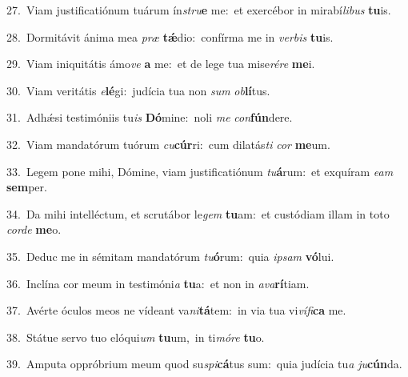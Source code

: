 {\numbfont\textcolor{\numbcolor}{27.}}~Viam justificatiónum tuárum ín\-\textit{stru}\-\textbf{e} me:~\star et exercébor in mirabí\-\textit{li}\-\textit{bus} \textbf{tu}\-is.\par
{\numbfont\textcolor{\numbcolor}{28.}}~Dormitávit ánima mea \textit{præ} \textbf{tǽ}\-dio:~\star confírma me in \textit{ver}\-\textit{bis} \textbf{tu}\-is.\par
{\numbfont\textcolor{\numbcolor}{29.}}~Viam iniquitátis ámo\textit{ve} \textbf{a} me:~\star et de lege tua mise\-\textit{ré}\-\textit{re} \textbf{me}\-i.\par
{\numbfont\textcolor{\numbcolor}{30.}}~Viam veritátis \textit{e}\-\textbf{lé}gi:~\star judícia tua non \textit{sum} \textit{ob}\-\textbf{lí}tus.\par
{\numbfont\textcolor{\numbcolor}{31.}}~Adhǽsi testimóniis tu\textit{is} \textbf{Dó}\-mine:~\star noli \textit{me} \textit{con}\-\textbf{fún}dere.\par
{\numbfont\textcolor{\numbcolor}{32.}}~Viam mandatórum tuórum \textit{cu}\-\textbf{cúr}ri:~\star cum dilatás\textit{ti} \textit{cor} \textbf{me}\-um.\par
{\numbfont\textcolor{\numbcolor}{33.}}~Legem pone mihi, Dómine, viam justificatiónum \textit{tu}\-\textbf{á}rum:~\star et exquíram \textit{e}\-\textit{am} \textbf{sem}\-per.\par
{\numbfont\textcolor{\numbcolor}{34.}}~Da mihi intelléctum, et scrutábor le\textit{gem} \textbf{tu}\-am:~\star et custódiam illam in toto \textit{cor}\-\textit{de} \textbf{me}\-o.\par
{\numbfont\textcolor{\numbcolor}{35.}}~Deduc me in sémitam mandatórum \textit{tu}\-\textbf{ó}rum:~\star quia \textit{ip}\-\textit{sam} \textbf{vó}\-lui.\par
{\numbfont\textcolor{\numbcolor}{36.}}~Inclína cor meum in testimóni\textit{a} \textbf{tu}\-a:~\star et non in \textit{a}\-\textit{va}\textbf{rí}tiam.\par
{\numbfont\textcolor{\numbcolor}{37.}}~Avérte óculos meos ne vídeant va\-\textit{ni}\-\textbf{tá}tem:~\star in via tua vi\-\textit{ví}\-\textit{fi}\textbf{ca} me.\par
{\numbfont\textcolor{\numbcolor}{38.}}~Státue servo tuo elóqui\textit{um} \textbf{tu}\-um,~\star in ti\-\textit{mó}\-\textit{re} \textbf{tu}\-o.\par
{\numbfont\textcolor{\numbcolor}{39.}}~Amputa oppróbrium meum quod su\-\textit{spi}\-\textbf{cá}tus sum:~\star quia judícia tu\textit{a} \textit{ju}\-\textbf{cún}da.\par
